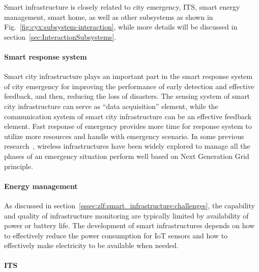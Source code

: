\documentclass[letterpaper, twocolumn, 10pt, conference]{IEEEtran}
\begin{document}
Smart infrastructure is closely related to city emergency, ITS, smart energy management, smart home, as well as other subsystems as shown in Fig.~\ref{fig:cyx:subsystem-interaction}, while more details will be discussed in section~\ref{sec:InteractionSubsystems}. 

\paragraph{Smart response system}

Smart city infrastructure plays an important part in the smart response system of city emergency for improving the performance of early detection and effective feedback, and then, reducing the loss of disasters. The sensing system of smart city infrastructure can serve as \enquote{data acquisition} element, while the communication system of smart city infrastructure can be an effective feedback element. Fast response of emergency provides more time for response system to utilize more resources and handle with emergency scenario. In some previous research~\cite{fantacci2010novel}, wireless infrastructures have been widely explored to manage all the phases of an emergency situation perform well based on Next Generation Grid principle.


\paragraph{Energy management}

As discussed in section~\ref{sssec:zlf:smart_infrastructure:challenges}, the capability and quality of infrastructure monitoring are typically limited by availability of power or battery life. The development of smart infrastructures depends on how to effectively reduce the power consumption for IoT sensors and how to effectively make electricity to be available when needed. 

\paragraph{ITS}
\end{document}
